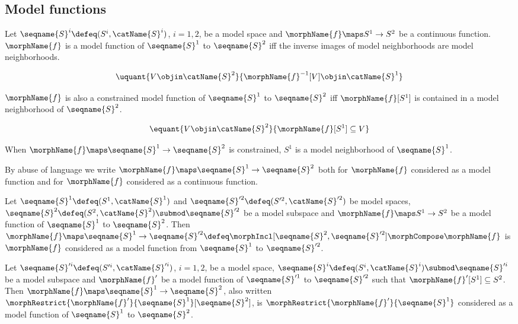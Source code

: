 \documentclass{article}
\begin{document}
\subsection{Model functions}
\begin{definition}
\label{def:modfunc}
Let $\seqname{S}^i \defeq (S^i, \catName{S}^i)$, $i=1,2$, be a model
space and $\morphName{f} \maps S^1 \to S^2$ be a continuous function.
$\morphName{f}$ is a model function of $\seqname{S}^1$ to $\seqname{S}^2$
iff the inverse images of model neighborhoods are model neighborhoods.

\begin{equation}
\uquant%
  {V \objin \catName{S}^2}
  {\morphName{f}^{-1}[V] \objin \catName{S}^1}
\end{equation}

$\morphName{f}$ is also a constrained model function of $\seqname{S}^1$
to $\seqname{S}^2$ iff $\morphName{f}[S^1]$ is contained in a model
neighborhood of $\seqname{S}^2$.

\begin{equation}
\equant%
  {V \objin \catName{S}^2}
  {\morphName{f}[S^1] \subseteq V}
\end{equation}

\begin{remark}
When $\morphName{f} \maps \seqname{S}^1 \to \seqname{S}^2$ is
constrained, $S^1$ is a model neighborhood of $\seqname{S}^1$.
\end{remark}

By abuse of language we write
$\morphName{f} \maps \seqname{S}^1 \to \seqname{S}^2$ both for
$\morphName{f}$ considered as a model function and for $\morphName{f}$
considered as a continuous function.

Let $\seqname{S}^1 \defeq (S^1, \catName{S}^1)$ and
$\seqname{S}'^2 \defeq (S'^2, \catName{S}'^2)$ be model spaces,
$\seqname{S}^2 \defeq (S^2, \catName{S}^2) \submod \seqname{S}'^2$ be a
model subspace and $\morphName{f} \maps S^1 \to S^2$ be a model function
of $\seqname{S}^1$ to $\seqname{S}^2$. Then
$
  \morphName{f} \maps \seqname{S}^1 \to \seqname{S}'^2 \defeq
  \morphIncl[{\seqname{S}^2},{\seqname{S}'^2}] \morphCompose \morphName{f}
$
is $\morphName{f}$ considered as a model function from $\seqname{S}^1$ to
$\seqname{S}'^2$.

Let $\seqname{S}'^i \defeq (S'^i, \catName{S}'^i)$, $i=1,2$, be a model
space,
$\seqname{S}^i \defeq (S^i, \catName{S}^i) \submod \seqname{S}'^i$ be a
model subspace and $\morphName{f}'$ be a model function of
$\seqname{S}'^1$ to $\seqname{S}'^2$ such that
$\morphName{f}'[S^1] \subseteq S^2$. Then
$\morphName{f} \maps \seqname{S}^1 \to \seqname{S}^2$, also written
$\morphRestrict{\morphName{f}'}{\seqname{S}^1}[\seqname{S}^2]$, is
$\morphRestrict{\morphName{f}'}{\seqname{S}^1}$ considered as a model
function of $\seqname{S}^1$ to $\seqname{S}^2$.
\end{definition}
\end{document}
